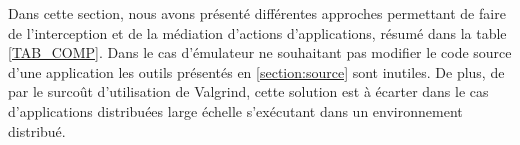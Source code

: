 Dans cette section, nous avons présenté différentes approches permettant de faire de l'interception et de la médiation d'actions d'applications, résumé dans la table \ref{TAB_COMP}. Dans le cas d'émulateur ne souhaitant pas modifier le code source d'une application les outils présentés en \ref{section:source} sont inutiles. De plus, de par le surcoût d'utilisation de Valgrind, cette solution est à écarter dans le cas d'applications distribuées large échelle s'exécutant dans un environnement distribué.

\begin{table}[H]
\caption{Comparaison des différentes solutions d'interception entre une
  application et le noyau.}
\label{TAB_COMP}
\end{table}
